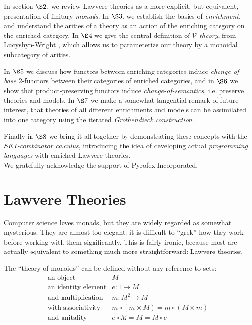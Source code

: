 \documentclass[a4paper,UKenglish]{article}
\theoremstyle{definition}
\newcommand{\V}{\mathscr{V}}
\begin{document}
In section $\S2$, we review Lawvere theories as a more explicit, but equivalent, presentation of finitary \textit{monads}. In $\S3$, we establish the basics of \textit{enrichment}, and understand the arities of a theory as an action of the enriching category on the enriched category. In $\S4$ we give the central definition of $\V$\textit{-theory}, from Lucyshyn-Wright \cite{rbb}, which allows us to parameterize our theory by a monoidal subcategory of arities.

In $\S5$ we discuss how functors between enriching categories induce \textit{change-of-base} 2-functors between their categories of enriched categories, and in $\S6$ we show that product-preserving functors induce \textit{change-of-semantics}, i.e. preserve theories and models. In $\S7$ we make a somewhat tangential remark of future interest, that theories of all different enrichments and models can be assimilated into one category using the iterated \textit{Grothendieck construction}.

Finally in $\S8$ we bring it all together by demonstrating these concepts with the $SKI$\textit{-combinator calculus}, introducing the idea of developing actual \textit{programming languages} with enriched Lawvere theories.\\

We gratefully acknowledge the support of Pyrofex Incorporated.\newpage

\section{Lawvere Theories}
Computer science loves monads, but they are widely regarded as somewhat mysterious. They are almost too elegant; it is difficult to ``grok'' how they work before working with them significantly. This is fairly ironic, because most are actually equivalent to something much more straightforward: Lawvere theories.

The ``theory of monoids'' can be defined without any reference to sets:
\[\begin{array}{rl}
\text{an object} & M\\
\text{an identity element} & e:1 \to M\\
\text{and multiplication} & m: M^2 \to M\\
\text{with associativity} & m \circ (m \times M) = m \circ (M \times m)\\
\text{and unitality} & e \circ M = M = M \circ e\\
\end{array}\]
\end{document}
